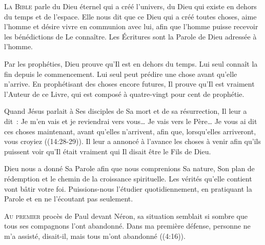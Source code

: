 \lettrine{L}{a Bible} parle du Dieu éternel qui a créé l'univers,
 du Dieu qui existe en dehors du temps et de l'espace.
 Elle nous dit que ce Dieu qui a créé toutes choses,
 aime l'homme et désire vivre en communion avec lui,
 afin que l'homme puisse recevoir les bénédictions de Le connaître.
 Les Écritures sont la Parole de Dieu adressée à l'homme.


Par les prophéties, Dieu prouve qu'Il est en dehors du temps.
 Lui seul connaît la fin depuis le commencement.
 Lui seul peut prédire une chose avant qu'elle n'arrive.
 En prophétisant des choses encore futures, Il prouve qu'Il est vraiment
 l'Auteur de ce Livre, qui est composé à quatre-vingt pour cent de prophétie. 

Quand Jésus parlait à Ses disciples de Sa mort et de sa résurrection,
 Il leur a dit~: 
 \Og Je m'en vais et je reviendrai vers vous\dots{}
 Je vais vers le Père\dots{} Je vous ai dit ces choses maintenant,
 avant qu'elles n'arrivent, afin que, lorsqu'elles arriveront,
 vous croyiez \Fg{} ((14:28-29)).
 Il leur a annoncé à l'avance les choses à venir afin qu'ils puissent
 voir qu'Il était vraiment qui Il disait être \ocadr le Fils de Dieu. 

Dieu nous a donné Sa Parole afin que nous comprenions Sa nature,
 Son plan de rédemption et le chemin de la croissance spirituelle.
 Les vérités qu'elle contient vont bâtir votre foi.
 Puissions-nous l'étudier quotidiennement, en pratiquant la Parole
 et en ne l'écoutant pas seulement.

\dvrule






\lettrine{A}{u premier} procès de Paul devant Néron,
 sa situation semblait si sombre que tous ses compagnons l'ont abandonné.
 \Og Dans ma première défense, personne ne m'a assisté,
 disait-il, mais tous m'ont abandonné \Fg{}
 ((4:16)).

